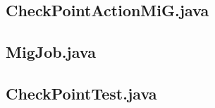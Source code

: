 \begin{landscape}
\subsection{CheckPointActionMiG.java}

\subsection{MigJob.java}

\subsection{CheckPointTest.java}

\end{landscape}
